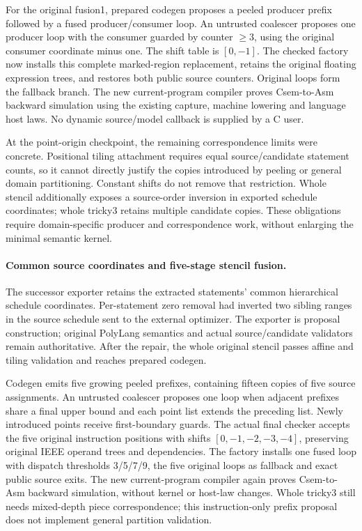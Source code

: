 For the original fusion1, prepared codegen proposes a peeled producer prefix
followed by a fused producer/consumer loop. An untrusted coalescer proposes one
producer loop with the consumer guarded by counter $\geq 3$, using the original
consumer coordinate minus one. The shift table is $[0,-1]$. The checked factory
now installs this complete marked-region replacement, retains the original
floating expression trees, and restores both public source counters. Original
loops form the fallback branch. The new current-program compiler proves
Csem-to-Asm backward simulation using the existing capture, machine lowering
and language host laws. No dynamic source/model callback is supplied by a C user.

At the point-origin checkpoint, the remaining correspondence limits were concrete.
Positional tiling attachment
requires equal source/candidate statement counts, so it cannot directly justify
the copies introduced by peeling or general domain partitioning. Constant shifts
do not remove that restriction. Whole stencil additionally exposes a source-order
inversion in exported schedule coordinates; whole tricky3 retains multiple
candidate copies. These obligations require domain-specific producer and
correspondence work, without enlarging the minimal semantic kernel.

\paragraph{Common source coordinates and five-stage stencil fusion.}
The successor exporter retains the extracted statements' common hierarchical
schedule coordinates. Per-statement zero removal had inverted two sibling
ranges in the source schedule sent to the external optimizer. The exporter is
proposal construction; original PolyLang semantics and actual source/candidate
validators remain authoritative. After the repair, the whole original stencil
passes affine and tiling validation and reaches prepared codegen.

Codegen emits five growing peeled prefixes, containing fifteen copies of five
source assignments. An untrusted coalescer proposes one loop when adjacent
prefixes share a final upper bound and each point list extends the preceding
list. Newly introduced points receive first-boundary guards. The actual final
checker accepts the five original instruction positions with shifts
$[0,-1,-2,-3,-4]$, preserving original IEEE operand trees and dependencies.
The factory installs one fused loop with dispatch thresholds 3/5/7/9, the five
original loops as fallback and exact public source exits. The new current-program
compiler again proves Csem-to-Asm backward simulation, without kernel or host-law
changes. Whole tricky3 still needs mixed-depth piece correspondence; this
instruction-only prefix proposal does not implement general partition validation.

